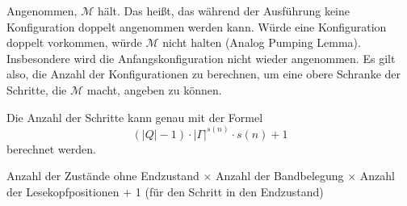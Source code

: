 Angenommen, $\mathcal{M}$ hält. Das heißt, das während der Ausführung keine
Konfiguration doppelt angenommen werden kann. Würde eine Konfiguration doppelt
vorkommen, würde $\mathcal{M}$ nicht halten (Analog Pumping Lemma). Insbesondere
wird die Anfangskonfiguration nicht wieder angenommen. Es gilt also, die Anzahl
der Konfigurationen zu berechnen, um eine obere Schranke der Schritte, die
$\mathcal{M}$ macht, angeben zu können.

Die Anzahl der Schritte kann genau mit der Formel
\[(|Q| - 1) \cdot |\Gamma|^{s(n)} \cdot s(n) + 1\]
berechnet werden.

Anzahl der Zustände ohne Endzustand $\times$ Anzahl der Bandbelegung $\times$
Anzahl der Lesekopfpositionen + 1 (für den Schritt in den Endzustand)
